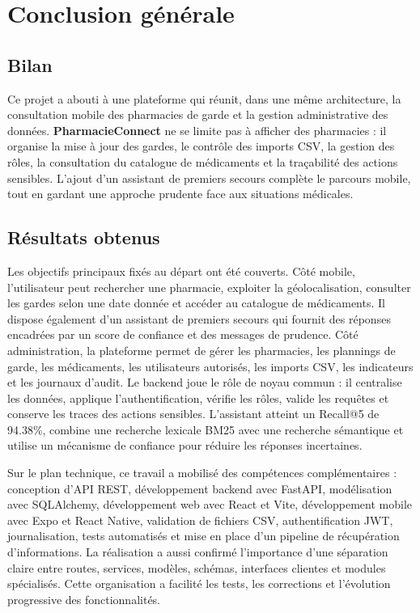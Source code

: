\chapter*{Conclusion générale}

\section*{Bilan}

Ce projet a abouti à une plateforme qui réunit, dans une même architecture, la consultation mobile des
pharmacies de garde et la gestion administrative des données. \textbf{PharmacieConnect} ne se limite pas à
afficher des pharmacies : il organise la mise à jour des gardes, le contrôle des imports CSV, la gestion des
rôles, la consultation du catalogue de médicaments et la traçabilité des actions sensibles. L'ajout d'un
assistant de premiers secours complète le parcours mobile, tout en gardant une approche prudente face aux
situations médicales.

\section*{Résultats obtenus}

Les objectifs principaux fixés au départ ont été couverts. Côté mobile, l'utilisateur peut rechercher une
pharmacie, exploiter la géolocalisation, consulter les gardes selon une date donnée et accéder au catalogue
de médicaments. Il dispose également d'un assistant de premiers secours qui fournit des réponses encadrées
par un score de confiance et des messages de prudence. Côté administration, la plateforme permet de gérer
les pharmacies, les plannings de garde, les médicaments, les utilisateurs autorisés, les imports CSV, les
indicateurs et les journaux d'audit. Le backend joue le rôle de noyau commun : il centralise les données,
applique l'authentification, vérifie les rôles, valide les requêtes et conserve les traces des actions
sensibles. L'assistant atteint un Recall@5 de 94.38\%, combine une recherche lexicale BM25 avec une
recherche sémantique et utilise un mécanisme de confiance pour réduire les réponses incertaines.

Sur le plan technique, ce travail a mobilisé des compétences complémentaires : conception d'API REST,
développement backend avec FastAPI, modélisation avec SQLAlchemy, développement web avec React et Vite,
développement mobile avec Expo et React Native, validation de fichiers CSV, authentification JWT,
journalisation, tests automatisés et mise en place d'un pipeline de récupération d'informations. La
réalisation a aussi confirmé l'importance d'une séparation claire entre routes, services, modèles,
schémas, interfaces clientes et modules spécialisés. Cette organisation a facilité les tests, les
corrections et l'évolution progressive des fonctionnalités.


